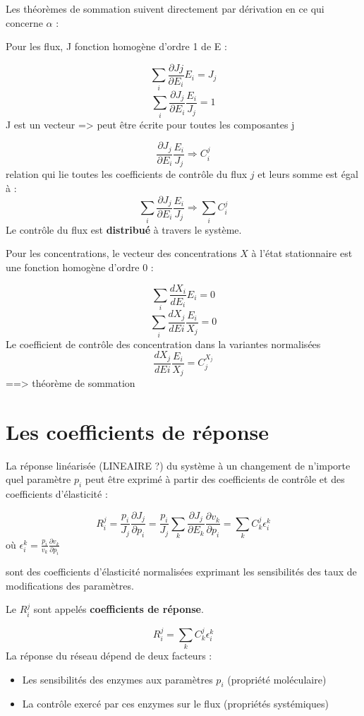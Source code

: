 Les théorèmes de sommation suivent directement par dérivation en ce qui concerne $\alpha$ :  

Pour les flux, J fonction homogène d'ordre 1  de E : 

$$ \sum_i \frac{ \partial Jj}{\partial E_i}E_i = J_j$$ 
$$ \sum_i \frac{\partial J_j}{\partial E_i} \frac{E_i}{J_j}=1 $$
J est un vecteur => peut être écrite pour toutes les composantes j

$$\frac{\partial J_j}{\partial E_i}\frac{E_i}{J_j}  \Rightarrow  C_i^j $$
relation qui lie toutes les coefficients de contrôle du flux $j$ et leurs somme est égal à :
$$	\sum_i \frac{\partial J_j}{\partial E_i}\frac{E_i}{J_j} \Rightarrow \sum_i C_i^j $$
Le contrôle du flux est \textbf{distribué} à travers le système.


Pour les concentrations, le vecteur des concentrations $X$ à l'état stationnaire est une fonction homogène d'ordre 0 :


$$ \sum_i \frac{dX_i}{dE_i}E_i = 0 $$
$$ \sum_i \frac{dX_j}{dEi} \frac{E_i}{X_j}=0 $$
Le coefficient de contrôle des concentration dans la variantes normalisées
$$ \frac{dX_j}{dEi} \frac{E_i}{X_j} = C_j^{X_j} $$
==> théorème de sommation


\section{Les coefficients de réponse}
La réponse linéarisée (LINEAIRE ?) du système à un changement de n'importe quel paramètre $p_i$ peut être exprimé à partir des coefficients de contrôle et des coefficients d'élasticité :

$$ R_i^j = \frac{p_i}{J_j} \frac{ \partial J_j}{\partial p_i} = \frac{p_i}{J_j} \sum_k \frac{\partial J_j}{\partial E_k} \frac{\partial v_k}{\partial p_i} 
		= \sum_k C_k^j \epsilon_i^k $$  où  $\epsilon_i^k = \frac{p_i}{v_k}\frac{\partial v_k}{\partial p_i} $

sont des coefficients d'élasticité normalisées exprimant les sensibilités des taux de modifications des paramètres.

Le $R_i^j$ sont appelés \textbf{coefficients de réponse}.


$$ R_i^j = \sum_k C_k^j \epsilon_i^k $$
La réponse du réseau dépend de deux facteurs :
\begin{itemize}
	\item Les sensibilités des enzymes aux paramètres $p_i$ (propriété moléculaire)
	\item La contrôle exercé par ces enzymes sur le flux (propriétés systémiques)
\end{itemize}

